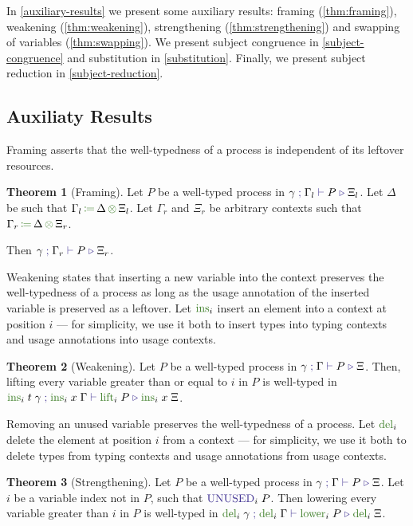 \documentclass[a4paper,UKenglish,cleveref,autoref,thm-restate,authorcolumns]{lipics-v2019}
\theoremstyle{definition}
\newtheorem{nitheorem}{Theorem}
\newcommand{\type}[1]{\textcolor{BlueViolet}{\operatorname{#1}}}
\newcommand{\func}[1]{\textcolor{OliveGreen}{\operatorname{#1}}}
\newcommand{\opctx}[3]{#1 \, \func{\coloneqq} \, #2 \, \func{\otimes} \, #3}
\newcommand{\types}[4]{#1 \; \type{;} \; #2 \; \type{\vdash} \; #3 \; \type{\triangleright} \; #4}
\newcommand{\Unused}{\type{UNUSED}}
\begin{document}
In \autoref{auxiliary-results} we present some auxiliary results: framing (\autoref{thm:framing}), weakening (\autoref{thm:weakening}), strengthening (\autoref{thm:strengthening}) and swapping of variables (\autoref{thm:swapping}).
We present subject congruence in \autoref{subject-congruence} and substitution in \autoref{substitution}.
Finally, we present subject reduction in \autoref{subject-reduction}.

\subsection{Auxiliaty Results}
\label{auxiliary-results}
Framing asserts that the well-typedness of a process is independent of its leftover resources.
\begin{nitheorem}[Framing]
  \label{thm:framing}
  Let $P$ be a well-typed process in $\types{\gamma}{\Gamma_l}{P}{\Xi_l}$.
  Let $\Delta$ be such that $\opctx{\Gamma_l}{\Delta}{\Xi_l}$.
  Let $\Gamma_r$ and $\Xi_r$ be arbitrary contexts such that $\opctx{\Gamma_r}{\Delta}{\Xi_r}$.

  Then $\types{\gamma}{\Gamma_r}{P}{\Xi_r}$.
\end{nitheorem}

Weakening states that inserting a new variable into the context preserves the well-typedness of a process as long as the usage annotation of the inserted variable is preserved as a leftover.
Let $\func{ins}_i$ insert an element into a context at position $i$ --- for simplicity, we use it both to insert types into typing contexts and usage annotations into usage contexts.
\begin{nitheorem}[Weakening]
  \label{thm:weakening}
  Let $P$ be a well-typed process in $\types{\gamma}{\Gamma}{P}{\Xi}$.
  Then, lifting every variable greater than or equal to $i$ in $P$ is well-typed in
  $\types{\func{ins}_i \; t \; \gamma}{\func{ins}_i \; x \; \Gamma}{\func{lift}_i \; P}{\func{ins}_i \; x \; \Xi}$.
\end{nitheorem}

Removing an unused variable preserves the well-typedness of a process.
Let $\func{del}_i$ delete the element at position $i$ from a context --- for simplicity, we use it both to delete types from typing contexts and usage annotations from usage contexts.
\begin{nitheorem}[Strengthening]
  \label{thm:strengthening} 
  Let $P$ be a well-typed process in $\types{\gamma}{\Gamma}{P}{\Xi}$.
  Let $i$ be a variable index not in $P$, such that $\Unused_i \; P$.
  Then lowering every variable greater than $i$ in $P$ is well-typed in $\types{\func{del}_i \; \gamma}{\func{del}_i \; \Gamma}{\func{lower}_i \; P}{\func{del}_i \; \Xi}$.
\end{nitheorem}
\end{document}
